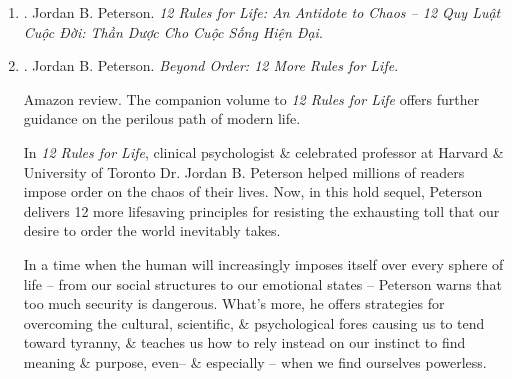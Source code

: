 \documentclass{article}
\begin{document}
\begin{enumerate}
\begin{itemize}
		\item ``1 of the most eclectic\footnote{not following one style or set of ideas but choosing from or using a wide variety. chiết trung, chủ nghĩa chiết trung.} \& stimulating public intellectuals at large today, fearless \& impassioned.'' -- {\it The Guardian}
		\item ``Someone with not only humanity \& humor, but serious depth \& substance $\ldots$ {\sc Peterson} has a truly cosmopolitan \& omnivorous intellect, but one that recognizes that things need grounding in a home if they are ever going to be meaningful grasped $\ldots$ As well as being funny, there is a burning sincerity to the man which only the most withered cynic could suspect.'' -- {\it The Spectator}
		\item ``{\sc Peterson} has become a kind of secular prophet who, in an era of lobotomized conformism, thinks out of the box $\ldots$ His message is overwhelmingly vital.'' -- {\sc Melanie Philips}, {\it The Times}
	\end{itemize}

	\item \cite{Peterson_rule_VN}. {\sc Jordan B. Peterson}. {\it12 Rules for Life: An Antidote to Chaos -- 12 Quy Luật Cuộc Đời: Thần Dược Cho Cuộc Sống Hiện Đại}.\hfill{\sf[done]}

	\item \cite{Peterson_beyond_order}. {\sc Jordan B. Peterson}. {\it Beyond Order: 12 More Rules for Life}. {}

	{\sf Amazon review.} The companion volume to {\it12 Rules for Life} offers further guidance on the perilous path of modern life.

	In {\it12 Rules for Life}, clinical psychologist \& celebrated professor at Harvard \& University of Toronto Dr. {\sc Jordan B. Peterson} helped millions of readers impose order on the chaos of their lives. Now, in this hold sequel, {\sc Peterson} delivers 12 more lifesaving principles for resisting the exhausting toll that our desire to order the world inevitably takes.

	In a time when the human will increasingly imposes itself over every sphere of life -- from our social structures to our emotional states -- {\sc Peterson} warns that too much security is dangerous. What's more, he offers strategies for overcoming the cultural, scientific, \& psychological fores causing us to tend toward tyranny, \& teaches us how to rely instead on our instinct to find meaning \& purpose, even-- \& especially -- when we find ourselves powerless.


\end{enumerate}
\end{document}
